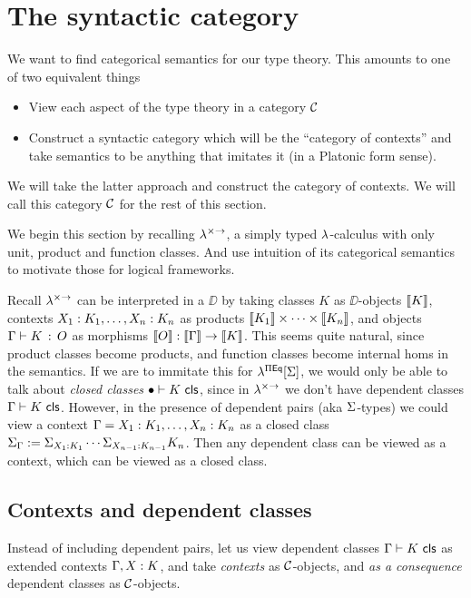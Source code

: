 \section{The syntactic category}

We want to find categorical semantics for our type theory.
This amounts to one of two equivalent things
\begin{itemize}
  \item View each aspect of the type theory in a category $\mathcal{C}$
  \item Construct a syntactic category which will be the ``category of contexts''
        and take semantics to be anything that imitates it (in a Platonic form sense).
\end{itemize}
We will take the latter approach and construct the category of contexts.
We will call this category $\mathcal{C}$ for the rest of this section.

We begin this section by recalling $\lambda^{\times \to}$,
a simply typed $\lambda$-calculus with only unit, product and function classes.
And use intuition of its categorical semantics to motivate those for logical frameworks.

Recall $\lambda^{\times \to}$ can be interpreted in a  $\DD$ by
taking classes $K$ as $\DD$-objects $\llbracket K \rrbracket$,
contexts $X_{1}:K_{1},\dots,X_{n} : K_{n}$
as products $\llbracket K_{1} \rrbracket \times \cdots \times \llbracket K_{n} \rrbracket$,
and objects $\Gamma \vdash K \, : \, O$ as morphisms $\llbracket O \rrbracket : \llbracket \Gamma \rrbracket \to \llbracket K \rrbracket$. %
This seems quite natural, since product classes become products,
and function classes become internal homs in the semantics.
If we are to immitate this for $\lambda^{\Pi \mathsf{Eq}}[\Sigma]$,
we would only be able to talk about \textit{closed classes} $\bullet \vdash K \,\, \mathsf{cls}$,
since in $\lambda^{\times \to}$ we don't have dependent classes $\Gamma \vdash K \,\, \mathsf{cls}$.
However, in the presence of dependent pairs (aka $\Sigma$-types) we
could view a context $\Gamma = X_{1}:K_{1},\dots,X_{n} : K_{n}$
as a closed class $\Sigma_{\Gamma} := \Sigma_{X_{1}:K_{1}} \cdots \Sigma_{X_{n-1}:K_{n-1}} K_{n}$.
Then any dependent class can be viewed as a context, which can be viewed as a closed class.

\subsection{Contexts and dependent classes}

Instead of including dependent pairs,
let us view dependent classes $\Gamma \vdash K \,\, \mathsf{cls}$ as extended contexts
$\Gamma,X : K$, and take \textit{contexts} as $\mathcal{C}$-objects,
and \textit{as a consequence} dependent classes as $\mathcal{C}$-objects.

